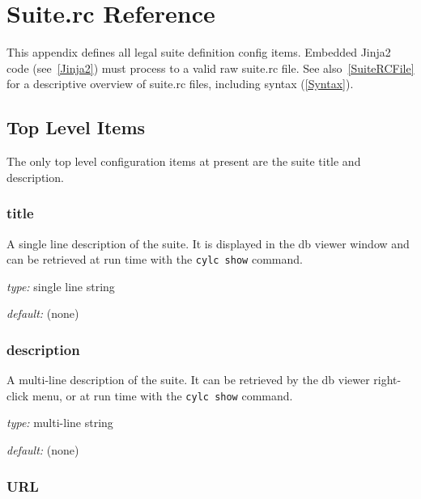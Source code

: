 \section{Suite.rc Reference}
\label{SuiteRCReference}

\lstset{language=bash}

This appendix defines all legal suite definition config items.
Embedded Jinja2 code (see~\ref{Jinja2}) must process to a valid
raw suite.rc file. See also~\ref{SuiteRCFile} for a descriptive
overview of suite.rc files, including syntax (\ref{Syntax}).

\subsection{Top Level Items}

The only top level configuration items at present are the suite title
and description.

\subsubsection{title}

A single line description of the suite. It is displayed in the db viewer
window and can be retrieved at run time with the
\lstinline=cylc show= command.

\begin{myitemize}
\item {\em type:} single line string
\item {\em default:} (none)
\end{myitemize}

\subsubsection{description}

A multi-line description of the suite. It can be retrieved by the db viewer
right-click menu, or at run time with the \lstinline=cylc show= command.

\begin{myitemize}
\item {\em type:} multi-line string
\item {\em default:} (none)
\end{myitemize}

\subsubsection{URL} \label{SuiteURL} 

